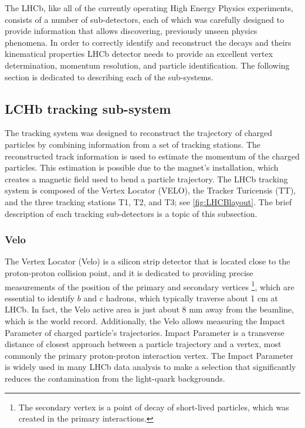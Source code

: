 The LHCb, like all of the currently operating High Energy Physics experiments, consists of a number of sub-detectors, each of which was carefully designed to provide information that allows discovering, previously unseen physics phenomena. In order to correctly identify and reconstruct the decays and theirs kinematical properties LHCb detector needs to provide an excellent vertex determination, momentum resolution, and particle identification. The following section is dedicated to describing each of the sub-systems. 

\subsection{LCHb tracking sub-system}
\label{sec:lhcb_tracking_subsystem}
The tracking system was designed to reconstruct the trajectory of charged particles by combining information from a set of tracking stations. The reconstructed track information is used to estimate the momentum of the charged particles. This estimation is possible due to the magnet's installation, which creates a magnetic field used to bend a particle trajectory. The LHCb tracking system is composed of the Vertex Locator (VELO), the Tracker Turicensis (TT), and the three tracking stations T1, T2, and T3; see \ref{fig:LHCBlayout}.  The brief description of each tracking sub-detectors is a topic of this subsection. 

\subsubsection{Velo}

The Vertex Locator (Velo) \cite{VELO} is a silicon strip detector that is located close to the proton-proton collision point, and it is dedicated to providing precise measurements of the position of the primary and secondary vertices \footnote{The secondary vertex is a point of decay of short-lived particles, which was created in the primary interactions. }, which are essential to identify $b$ and $c$ hadrons, which typically traverse about 1 cm at LHCb.  
In fact, the Velo active area is just about 8 mm away from the beamline, which is the world record. Additionally, the Velo allows measuring the Impact Parameter of charged particle's trajectories. Impact Parameter is a transverse distance of closest approach between a particle trajectory and a vertex, most commonly the primary proton-proton interaction vertex. The Impact Parameter is widely used in many LHCb data analysis to make a selection that significantly reduces the contamination from the light-quark backgrounds.  


